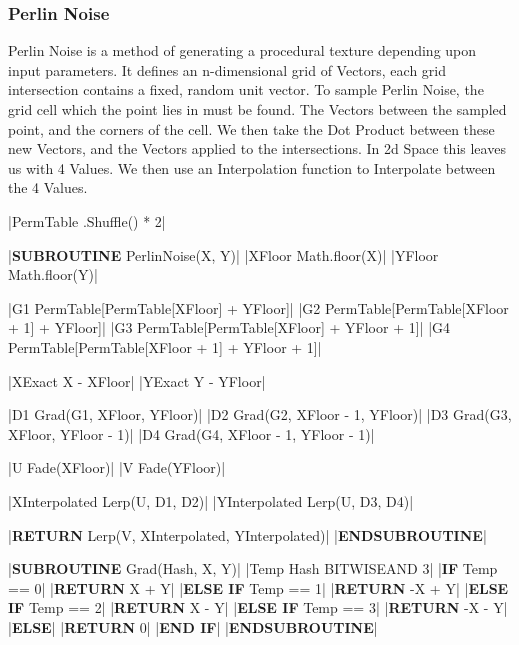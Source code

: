 \begin{flushleft}
                \vspace{0.5cm}
            \subsubsection{Perlin Noise}
                Perlin Noise is a method of generating a procedural texture depending upon input parameters. It defines an n-dimensional
                grid of Vectors, each grid intersection contains a fixed, random unit vector. To sample Perlin Noise, the grid cell which
                the point lies in must be found. The Vectors between the sampled point, and the corners of the cell. We then take the Dot
                Product between these new Vectors, and the Vectors applied to the intersections. In 2d Space this leaves us with 4 Values.
                We then use an Interpolation function to Interpolate between the 4 Values. 
            
                \vspace{0.2cm}
                \begin{pseudocode}
|PermTable \leftarrow [1 \rightarrow 255].Shuffle() * 2|

|\textbf{SUBROUTINE} PerlinNoise(X, Y)|
    |XFloor \leftarrow Math.floor(X)|
    |YFloor \leftarrow Math.floor(Y)|

    |G1 \leftarrow PermTable[PermTable[XFloor] + YFloor]|
    |G2 \leftarrow PermTable[PermTable[XFloor + 1] + YFloor]|
    |G3 \leftarrow PermTable[PermTable[XFloor] + YFloor + 1]|
    |G4 \leftarrow PermTable[PermTable[XFloor + 1] + YFloor + 1]|

    |XExact \leftarrow X - XFloor|
    |YExact \leftarrow Y - YFloor|

    |D1 \leftarrow Grad(G1, XFloor, YFloor)|
    |D2 \leftarrow Grad(G2, XFloor - 1, YFloor)|
    |D3 \leftarrow Grad(G3, XFloor, YFloor - 1)|
    |D4 \leftarrow Grad(G4, XFloor - 1, YFloor - 1)|

    |U \leftarrow Fade(XFloor)|
    |V \leftarrow Fade(YFloor)|

    |XInterpolated \leftarrow Lerp(U, D1, D2)|
    |YInterpolated \leftarrow Lerp(U, D3, D4)|

    |\textbf{RETURN} Lerp(V, XInterpolated, YInterpolated)|
|\textbf{ENDSUBROUTINE}|

|\textbf{SUBROUTINE} Grad(Hash, X, Y)|
    |Temp \leftarrow Hash BITWISEAND 3|
    |\textbf{IF} Temp == 0|
        |\textbf{RETURN} X + Y|
    |\textbf{ELSE IF} Temp == 1|
        |\textbf{RETURN} -X + Y|
    |\textbf{ELSE IF} Temp == 2|
        |\textbf{RETURN} X - Y|
    |\textbf{ELSE IF} Temp == 3|
        |\textbf{RETURN} -X - Y|
    |\textbf{ELSE}|
        |\textbf{RETURN} 0|
    |\textbf{END IF}|
|\textbf{ENDSUBROUTINE}|


\end{pseudocode}
\end{flushleft}
